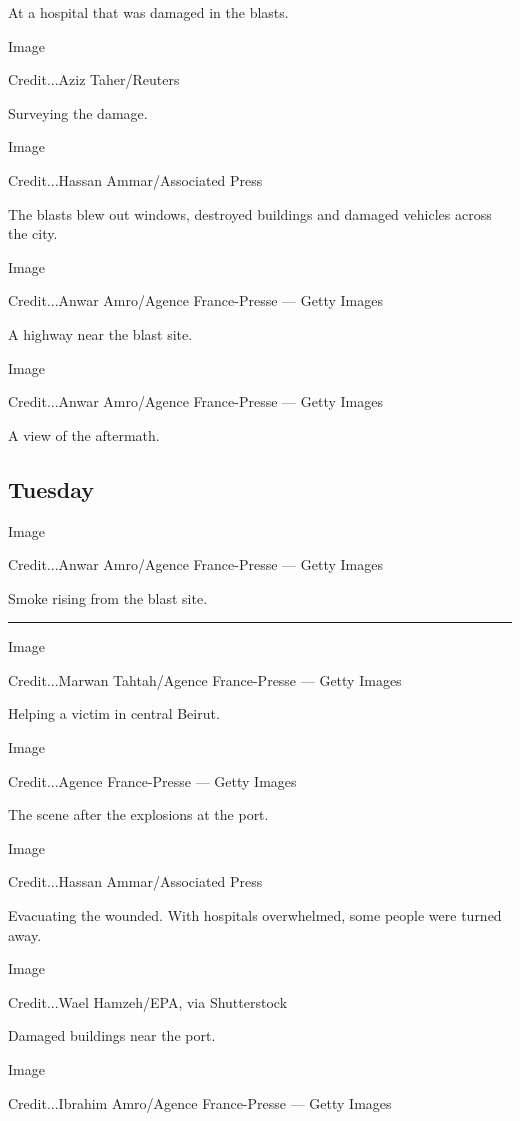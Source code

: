 At a hospital that was damaged in the blasts.

Image

Credit...Aziz Taher/Reuters

Surveying the damage.

Image

Credit...Hassan Ammar/Associated Press

The blasts blew out windows, destroyed buildings and damaged vehicles
across the city.

Image

Credit...Anwar Amro/Agence France-Presse --- Getty Images

A highway near the blast site.

Image

Credit...Anwar Amro/Agence France-Presse --- Getty Images

A view of the aftermath.

\hypertarget{tuesday}{%
\subsection{Tuesday}\label{tuesday}}

Image

Credit...Anwar Amro/Agence France-Presse --- Getty Images

Smoke rising from the blast site.

\begin{center}\rule{0.5\linewidth}{\linethickness}\end{center}

Image

Credit...Marwan Tahtah/Agence France-Presse --- Getty Images

Helping a victim in central Beirut.

Image

Credit...Agence France-Presse --- Getty Images

The scene after the explosions at the port.

Image

Credit...Hassan Ammar/Associated Press

Evacuating the wounded. With hospitals overwhelmed, some people were
turned away.

Image

Credit...Wael Hamzeh/EPA, via Shutterstock

Damaged buildings near the port.

Image

Credit...Ibrahim Amro/Agence France-Presse --- Getty Images

